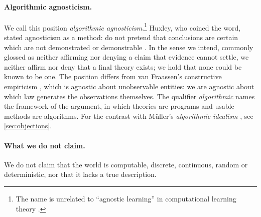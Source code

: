 \paragraph{Algorithmic agnosticism.}
We call this position \emph{algorithmic agnosticism}.\footnote{The name is unrelated
to ``agnostic learning'' in computational learning theory \citep{kearns1994}.} Huxley, who coined the word, stated agnosticism as a method:
do not pretend that conclusions are certain which are not demonstrated or demonstrable
\citep[pp.~245--246]{huxley1889}. In the sense we intend, commonly glossed as neither affirming
nor denying a claim that evidence cannot settle, we neither affirm nor deny that a final
theory exists; we hold that none could be known to be one. The position differs from van
Fraassen's constructive empiricism \citep{vanfraassen1980}, which is agnostic about
unobservable entities: we are agnostic about which law generates the observations
themselves. The qualifier \emph{algorithmic} names the framework of the argument, in
which theories are programs and usable methods are algorithms. For the contrast with
Müller's \emph{algorithmic idealism} \citep{muller2020,muller2026}, see
\cref{sec:objections}.

\paragraph{What we do not claim.}
We do not claim that the world is computable, discrete, continuous, random or
deterministic, nor that it lacks a true description.

